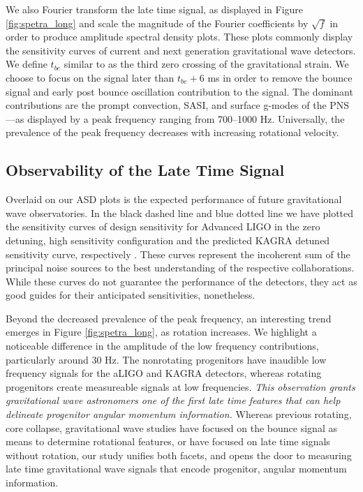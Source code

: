 \documentclass[twocolumn,times]{aastex62}  %
\begin{document}
We also Fourier transform the late time signal, as displayed in Figure \ref{fig:spetra_long} and scale the magnitude of the Fourier coefficients by $\sqrt{f}$ in order to produce amplitude spectral density plots.  These plots commonly display the sensitivity curves of current and next generation gravitational wave detectors.  We define $t_{be}$ similar to \citet{richers:2017} as the third zero crossing of the gravitational strain.  We choose to focus on the signal later than $t_{be} + 6$ ms in order to remove the bounce signal and early post bounce oscillation contribution to the signal.  The dominant contributions are the prompt convection, SASI, and surface g-modes of the PNS---as displayed by a peak frequency ranging from 700--1000 Hz.  Universally, the prevalence of the peak frequency decreases with increasing rotational velocity.  




\subsection{Observability of the Late Time Signal}

 Overlaid on our ASD plots is the expected performance of future gravitational wave observatories.  In the black dashed line and blue dotted line we have plotted the sensitivity curves of design sensitivity for Advanced LIGO in the zero detuning, high sensitivity configuration and the predicted KAGRA detuned sensitivity curve, respectively \citep{komari:2017,barsotti:2018}.
These curves represent the incoherent sum of the principal noise sources to the best understanding of the respective collaborations.  While these curves do not guarantee the performance of the detectors, they act as good guides for their anticipated sensitivities, nonetheless. 




Beyond the decreased prevalence of the peak frequency, an interesting trend emerges in Figure \ref{fig:spetra_long}, as rotation increases.  We highlight a noticeable difference in the amplitude of the low frequency contributions, particularly around 30 Hz.  The nonrotating progenitors have inaudible low frequency signals for the aLIGO and KAGRA detectors, whereas rotating progenitors create measureable signals at low frequencies.  \textit{This observation grants gravitational wave astronomers one of the first late time features that can help delineate progenitor angular momentum information.}  Whereas previous rotating, core collapse, gravitational wave studies have focused on the bounce signal as means to determine rotational features, or have focused on late time signals without rotation, our study unifies both facets, and opens the door to measuring late time gravitational wave signals that encode progenitor, angular momentum information. 
\end{document}
